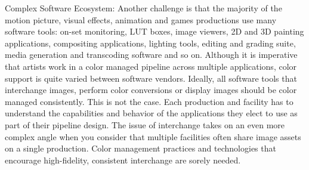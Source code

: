
Complex Software Ecosystem: Another challenge is that the majority of the motion picture, visual effects, animation and games productions use many software tools: on-set monitoring, LUT boxes, image viewers, 2D and 3D painting applications, compositing applications, lighting tools, editing and grading suite, media generation and transcoding software  and so on. Although it is imperative that artists work in a color managed pipeline across multiple applications, color support is quite varied between software vendors. Ideally, all software tools that interchange images, perform color conversions or display images should be color managed consistently. This is not the case. Each production and facility has to understand the capabilities and behavior of the applications they elect to use as part of their pipeline design. The issue of interchange takes on an even more complex angle when you consider that multiple facilities often share image assets on a single production. Color management practices and technologies that encourage high-fidelity, consistent interchange are sorely needed.

